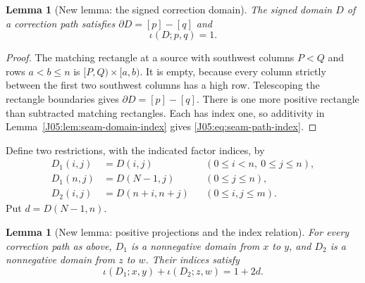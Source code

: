 \documentclass[11pt,oneside]{report}
\newtheorem{lemma}[theorem]{Lemma}
\theoremstyle{definition}
\numberwithin{equation}{section}
\begin{document}
\begin{lemma}[New lemma: the signed correction domain]
\label{J05:lem:seam-signed-domain}
The signed domain $D$ of a correction path satisfies
$\partial D=[p]-[q]$ and
\begin{equation}\label{J05:eq:seam-path-index}
 \iota(D;p,q)=1.
\end{equation}
\end{lemma}
\begin{proof}
The matching rectangle at a source with southwest columns $P<Q$ and
rows $a<b\le n$ is $[P,Q)\times[a,b)$. It is empty, because every
column strictly between the first two southwest columns has a high row.
Telescoping the rectangle boundaries gives $\partial D=[p]-[q]$.
There is one more positive rectangle than subtracted matching rectangles.
Each has index one, so additivity in Lemma~\ref{J05:lem:seam-domain-index}
gives \eqref{J05:eq:seam-path-index}.
\end{proof}

Define two restrictions, with the indicated factor indices, by
\begin{equation}\label{J05:eq:seam-domain-projections}
 \begin{aligned}
 D_1(i,j)&=D(i,j) &&(0\le i<n,\ 0\le j\le n),\\
 D_1(n,j)&=D(N-1,j) &&(0\le j\le n),\\
 D_2(i,j)&=D(n+i,n+j) &&(0\le i,j\le m).
 \end{aligned}
\end{equation}
Put $d=D(N-1,n)$.

\begin{lemma}[New lemma: positive projections and the index relation]
\label{J05:lem:seam-positive-projections}
For every correction path as above, $D_1$ is a nonnegative domain from
$x$ to $y$, and $D_2$ is a nonnegative domain from $z$ to $w$.
Their indices satisfy
\begin{equation}\label{J05:eq:seam-projected-index}
 \iota(D_1;x,y)+\iota(D_2;z,w)=1+2d.
\end{equation}
\end{lemma}
\end{document}
